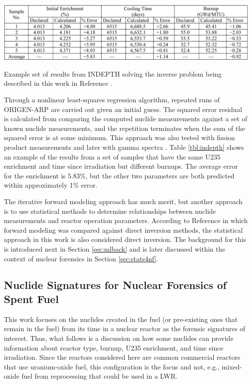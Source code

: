 \begin{table}[!htb]
  \centering
  \includegraphics[width=\linewidth]{./chapters/litrev/indepth.png}
  \caption[Example of results from \acrshort{INDEPTH}]
          {Example set of results from \acrshort{INDEPTH} solving the inverse 
           problem being described in this work in Reference 
           \cite{grogan_indepth_2018}.}
  \label{tbl:indepth}
\end{table}

Through a nonlinear least-squares regression algorithm, repeated runs of
\gls{ORIGEN-ARP} are carried out given an initial guess. The squared error
residual is calculated from comparing the computed nuclide measurements against
a set of known nuclide measurements, and the repetition terminates when the sum
of the squared error is at some minimum.  \cite{weber_2006} This approach was
also tested with fission product measurements \cite{weber_2010} and later with
gamma spectra \cite{weber_2011}. Table \ref{tbl:indepth} shows an example of
the results from a set of samples that have the same \gls{U235} enrichment and
time since irradiation but different burnups.  The average error for the
enrichment is 5.83\%, but the other two parameters are both predicted within
approximately 1\% error. 

The iterative forward modeling approach has much merit, but another approach is
to use statistical methods to determine relationships between nuclide
measurements and reactor operation parameters. According to Reference
\cite{inverse_compare} in which forward modeling was compared against direct
inversion methods, the statistical approach in this work is also considered
direct inversion. The background for this is introduced next in Section
\ref{sec:mlback} and is later discussed within the context of nuclear forensics
in Section \ref{sec:stats4nf}.

\subsection{Nuclide Signatures for Nuclear Forensics of Spent Fuel}
\label{sec:nucs}

This work focuses on the nuclides created in the fuel (or pre-existing ones
that remain in the fuel) from its time in a nuclear reactor as the forensic
signatures of interest. Thus, what follows is a discussion on how some nuclides
can provide information about reactor type, burnup, \gls{U235} enrichment, and
time since irradiation.  Since the reactors considered here are common
commercial reactors that use uranium-oxide fuel, this configuration is the focus
and not, e.g., mixed-oxide fuel from reprocessing that could be used in a
\gls{LWR}.

